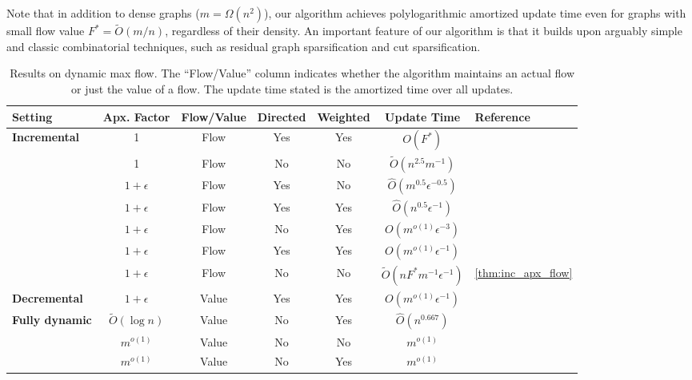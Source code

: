 \documentclass[11pt,a4paper]{article}
\newcommand{\tO}{\ensuremath{\widetilde O}}
\newcommand{\hO}{\ensuremath{\widehat O}}
\newcommand{\eps}{\epsilon}
\begin{document}
Note that in addition to dense graphs ($m=\Omega(n^2)$), our algorithm achieves polylogarithmic amortized update time even for graphs with small flow value $F^* = \tO(m/n)$, regardless of their density. An important feature of our algorithm is that it builds upon arguably simple and classic combinatorial techniques, such as residual graph sparsification and cut sparsification.

\begin{table}[t]
\setlength{\tabcolsep}{5.2pt}
\small
\centering
\begin{tabular}{lcccccl}
\toprule
\textbf{Setting} & \textbf{Apx. Factor} & \textbf{Flow/Value} & \textbf{Directed} & \textbf{Weighted} & \textbf{Update Time} & \textbf{Reference} \\
\midrule
\multirow{7}{*}{\textbf{Incremental}}
& 1 & Flow & Yes & Yes & $O(F^*)$ & \cite{Hen97vertexconnectivity, GK21misflowmatch} \\
& 1 & Flow & No & No & $\tO(n^{2.5}m^{-1})$ & \cite{GH23incflow} \\
& $1+\eps$ & Flow & Yes & No & $\hO(m^{0.5}\eps^{-0.5})$ & \cite{GH23incflow} \\
& $1+\eps$ & Flow & Yes & Yes & $\hO(n^{0.5}\eps^{-1})$ & \cite{vdBLS23incmaxflow} \\
& $1+\eps$ & Flow & No & Yes & $O(m^{o(1)}\eps^{-3})$ & \cite{vdBCK24incflow} \\
& $1+\eps$ & Flow & Yes & Yes & $O(m^{o(1)}\eps^{-1})$ & \cite{CKL24incremental} \\
& $1+\eps$ & Flow & No & No & $\tO(nF^* m^{-1} \eps^{-1})$ & \cref{thm:inc_apx_flow} \\
\cmidrule{1-7}
\multirow{1}{*}{\textbf{Decremental}}
& $1+\epsilon$ & Value & Yes & Yes & $O(m^{o(1)}\epsilon^{-1})$ & \cite{vdBCK24decremental} \\
\cmidrule{1-7}
\multirow{3}{*}{\textbf{Fully dynamic}}
& $\tO(\log n)$ & Value & No & Yes & $\hO(n^{0.667})$ & \cite{CGH20dynjtree} \\
& $m^{o(1)}$ & Value & No & No & $m^{o(1)}$ & \cite{GRST21xhierarchy} \\
& $m^{o(1)}$ & Value & No & Yes & $m^{o(1)}$ & \cite{vdBCK24decremental} \\
\bottomrule
\end{tabular}
\caption{Results on dynamic max flow. The ``Flow/Value'' column indicates whether the algorithm maintains an actual flow or just the value of a flow. The update time stated is the amortized time over all updates.}
\label{tab:dynamic_max_flow}
\end{table}
\end{document}
